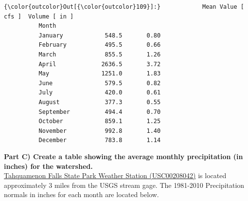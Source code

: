\documentclass[11pt]{article}
\begin{document}
\begin{Verbatim}[commandchars=\\\{\}]
{\color{outcolor}Out[{\color{outcolor}109}]:}            Mean Value [ cfs ]  Volume [ in ]
          Month                                       
          January            548.5       0.80
          February           495.5       0.66
          March              855.5       1.26
          April             2636.5       3.72
          May               1251.0       1.83
          June               579.5       0.82
          July               420.0       0.61
          August             377.3       0.55
          September          494.4       0.70
          October            859.1       1.25
          November           992.8       1.40
          December           783.8       1.14
\end{Verbatim}
            
    \textbf{Part C) Create a table showing the average monthly precipitation
(in inches) for the watershed.} \\

\href{https://www.ncdc.noaa.gov/cdo-web/datasets/NORMAL_DLY/stations/GHCND:USC00208043/detail}{Tahquamenon
Falls State Park Weather Station (USC00208042)} is located approximately
3 miles from the USGS stream gage. The 1981-2010 Precipitation normals
in inches for each month are located below.
\end{document}
